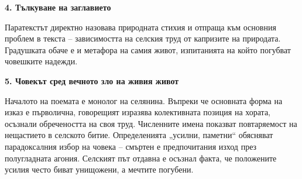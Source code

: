 \documentclass[12pt,a4paper]{article}
\begin{document}
\vspace{0.1cm}
\textbf{4. Тълкуване на заглавието}
\vspace{0.1cm}

\indent Паратекстът директно назовава природната стихия и отпраща към основния проблем в текста – зависимостта на селския труд от капризите на природата. Градушката обаче е и метафора на самия живот, изпитанията на който погубват човешките надежди.

\vspace{0.1cm}
\textbf{5. Човекът сред вечното зло на живия живот}
\vspace{0.1cm}

\indent Началото на поемата е монолог на селянина. Въпреки че основната форма на изказ е първолична, говорещият изразява колективната позиция на хората, осъзнали обречеността на своя труд. Численните имена показват повтаряемост на нещастието в селското битие. Определенията „усилни, паметни“ обясняват парадоксалния избор на човека – смъртен е предпочитания изход през полугладната агония. Селският път отдавна е осъзнал факта, че положените усилия често биват унищожени, а мечтите погубени.
\end{document}
